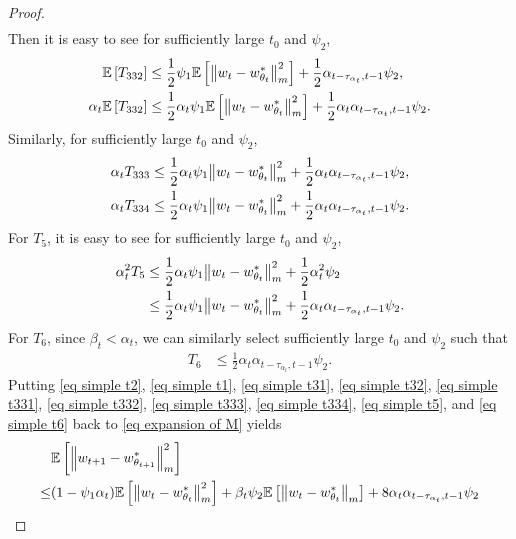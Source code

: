 \documentclass[twoside,11pt]{article}
\newcommand{\E}{\mathbb{E}}
\numberwithin{assucounter}{section}
\begin{document}
\begin{proof}
\begin{align}
\end{align}
Then it is easy to see for sufficiently large $t_0$ and $\psi_2$,
\begin{align}
  \E\left[T_{332}\right]&\leq \frac{1}{2} \psi_1  \E \left[\norm{w_t - w^*_{\theta_t}}_m^2\right] + \frac{1}{2} \alpha_{t-\tau_{\alpha_t}, t-1} \psi_2, \\
  \label{eq simple t332}
  \alpha_t\E\left[T_{332}\right]&\leq \frac{1}{2}\alpha_t \psi_1  \E \left[\norm{w_t - w^*_{\theta_t}}_m^2\right] + \frac{1}{2}\alpha_t \alpha_{t-\tau_{\alpha_t}, t-1} \psi_2.
\end{align}
Similarly, for sufficiently large $t_0$ and $\psi_2$,
\begin{align}
  \label{eq simple t333}
  \alpha_t T_{333}&\leq \frac{1}{2}\alpha_t \psi_1 \norm{w_t - w^*_{\theta_t}}_m^2 + \frac{1}{2}\alpha_t \alpha_{t-\tau_{\alpha_t}, t-1} \psi_2, \\
  \label{eq simple t334}
  \alpha_t T_{334}&\leq \frac{1}{2}\alpha_t \psi_1 \norm{w_t - w^*_{\theta_t}}_m^2 + \frac{1}{2}\alpha_t \alpha_{t-\tau_{\alpha_t}, t-1} \psi_2.
\end{align}
For $T_5$,
it is easy to see for sufficiently large $t_0$ and $\psi_2$,
\begin{align}
  \label{eq simple t5}
  \alpha_t^2 T_5 &\leq \frac{1}{2}\alpha_t \psi_1 \norm{w_t - w^*_{\theta_t}}_m^2 + \frac{1}{2}\alpha_t^2 \psi_2 \\
  &\leq \frac{1}{2}\alpha_t \psi_1 \norm{w_t - w^*_{\theta_t}}_m^2 + \frac{1}{2}\alpha_t \alpha_{t-\tau_{\alpha_t}, t-1} \psi_2.
\end{align}
For $T_6$,
since $\beta_t < \alpha_t$,
we can similarly select sufficiently large $t_0$ and $\psi_2$ such that
\begin{align}
  \label{eq simple t6}
  T_6 &\leq \frac{1}{2}\alpha_t\alpha_{t-\tau_{\alpha_t}, t-1} \psi_2.
\end{align}
Putting \eqref{eq simple t2}, \eqref{eq simple t1}, \eqref{eq simple t31}, \eqref{eq simple t32}, \eqref{eq simple t331}, \eqref{eq simple t332},  \eqref{eq simple t333}, \eqref{eq simple t334}, \eqref{eq simple t5}, and \eqref{eq simple t6} back to \eqref{eq expansion of M} yields
\begin{align}
  \label{eq sa bound recursive}
  &\E\left[\norm{w_{t+1} - w^*_{\theta_{t+1}}}_m^2\right] \\ 
  \leq& (1 - \psi_1\alpha_t) \E\left[\norm{w_{t} - w^*_{\theta_{t}}}_m^2\right] + \beta_t\psi_2\E\left[\norm{w_{t} - w^*_{\theta_{t}}}_m\right] + 8 \alpha_t \alpha_{t-\tau_{\alpha_t}, t-1} \psi_2 \\

\end{align}
\end{proof}
\end{document}
